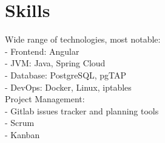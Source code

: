 \section*{Skills}
{ %
  Wide range of technologies, most notable:\\
  - Frontend: Angular\\
  - JVM: Java, Spring Cloud\\
  - Database: PostgreSQL, pgTAP\\
  - DevOps: Docker, Linux, iptables
  \break
  \\
  Project Management:\\
  - Gitlab issues tracker and planning tools\\
  - Scrum\\
  - Kanban
}
